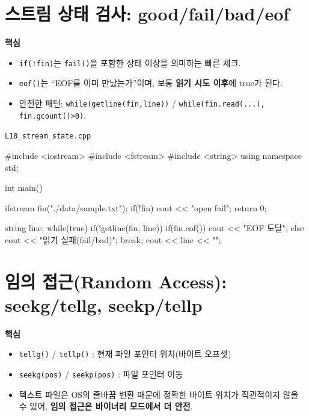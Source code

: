 \documentclass[11pt,a4paper]{article}
\newcommand{\filetag}[1]{\texttt{\color{Accent}#1}}
\begin{document}
\section{스트림 상태 검사: good/fail/bad/eof}
\begin{GoalBox}
\textbf{핵심}
\begin{itemize}[leftmargin=18pt]
  \item \texttt{if(!fin)}는 \texttt{fail()}을 포함한 상태 이상을 의미하는 빠른 체크.
  \item \texttt{eof()}는 ``EOF를 이미 만났는가''이며, 보통 \textbf{읽기 시도 이후}에 true가 된다. %
  \item 안전한 패턴: \texttt{while(getline(fin,line))} / \texttt{while(fin.read(...), fin.gcount()>0)}.
\end{itemize}
\end{GoalBox}

\noindent\filetag{L10\_stream\_state.cpp}
\begin{cppcode}
#include <iostream>
#include <fstream>
#include <string>
using namespace std;

int main() {
    ifstream fin("./data/sample.txt");
    if(!fin) { cout << "open fail\n"; return 0; }

    string line;
    while(true) {
        if(!getline(fin, line)) {
            if(fin.eof()) cout << "EOF 도달\n";
            else cout << "읽기 실패(fail/bad)\n";
            break;
        }
        cout << line << "\n";
    }
}
\end{cppcode}

\section{임의 접근(Random Access): seekg/tellg, seekp/tellp}
\begin{GoalBox}
\textbf{핵심}
\begin{itemize}[leftmargin=18pt]
  \item \texttt{tellg()} / \texttt{tellp()} : 현재 파일 포인터 위치(바이트 오프셋) %
  \item \texttt{seekg(pos)} / \texttt{seekp(pos)} : 파일 포인터 이동
  \item 텍스트 파일은 OS의 줄바꿈 변환 때문에 정확한 바이트 위치가 직관적이지 않을 수 있어,
        \textbf{임의 접근은 바이너리 모드에서 더 안전}.
\end{itemize}
\end{GoalBox}
\end{document}
